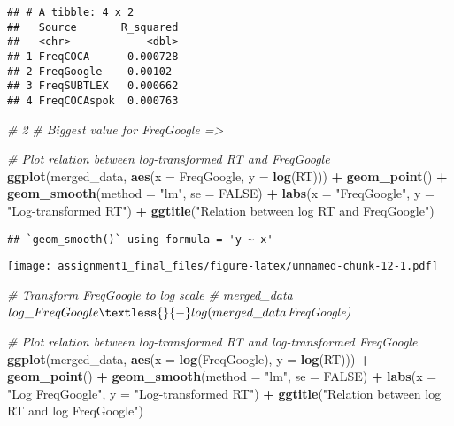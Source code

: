 \documentclass[
]{article}
\newenvironment{Shaded}{\begin{snugshade}}{\end{snugshade}}
\newcommand{\AttributeTok}[1]{\textcolor[rgb]{0.13,0.29,0.53}{#1}}
\newcommand{\CommentTok}[1]{\textcolor[rgb]{0.56,0.35,0.01}{\textit{#1}}}
\newcommand{\ConstantTok}[1]{\textcolor[rgb]{0.56,0.35,0.01}{#1}}
\newcommand{\FunctionTok}[1]{\textcolor[rgb]{0.13,0.29,0.53}{\textbf{#1}}}
\newcommand{\NormalTok}[1]{#1}
\newcommand{\SpecialCharTok}[1]{\textcolor[rgb]{0.81,0.36,0.00}{\textbf{#1}}}
\newcommand{\StringTok}[1]{\textcolor[rgb]{0.31,0.60,0.02}{#1}}
\begin{document}
\begin{verbatim}
## # A tibble: 4 x 2
##   Source       R_squared
##   <chr>            <dbl>
## 1 FreqCOCA      0.000728
## 2 FreqGoogle    0.00102 
## 3 FreqSUBTLEX   0.000662
## 4 FreqCOCAspok  0.000763
\end{verbatim}

\begin{Shaded}
\begin{Highlighting}[]
\CommentTok{\# 2}
\CommentTok{\# Biggest value for FreqGoogle =\textgreater{}}

\CommentTok{\# Plot relation between log{-}transformed RT and FreqGoogle}
\FunctionTok{ggplot}\NormalTok{(merged\_data, }\FunctionTok{aes}\NormalTok{(}\AttributeTok{x =}\NormalTok{ FreqGoogle, }\AttributeTok{y =} \FunctionTok{log}\NormalTok{(RT))) }\SpecialCharTok{+}
  \FunctionTok{geom\_point}\NormalTok{() }\SpecialCharTok{+}
  \FunctionTok{geom\_smooth}\NormalTok{(}\AttributeTok{method =} \StringTok{"lm"}\NormalTok{, }\AttributeTok{se =} \ConstantTok{FALSE}\NormalTok{) }\SpecialCharTok{+}
  \FunctionTok{labs}\NormalTok{(}\AttributeTok{x =} \StringTok{"FreqGoogle"}\NormalTok{, }\AttributeTok{y =} \StringTok{"Log{-}transformed RT"}\NormalTok{) }\SpecialCharTok{+}
  \FunctionTok{ggtitle}\NormalTok{(}\StringTok{"Relation between log RT and FreqGoogle"}\NormalTok{)}
\end{Highlighting}
\end{Shaded}

\begin{verbatim}
## `geom_smooth()` using formula = 'y ~ x'
\end{verbatim}

\texttt{[image: assignment1\_final\_files/figure-latex/unnamed-chunk-12-1.pdf]}

\begin{Shaded}
\begin{Highlighting}[]
\CommentTok{\# Transform FreqGoogle to log scale}
\CommentTok{\# merged\_data$log\_FreqGoogle \textless{}{-} log(merged\_data$FreqGoogle)}

\CommentTok{\# Plot relation between log{-}transformed RT and log{-}transformed FreqGoogle}
\FunctionTok{ggplot}\NormalTok{(merged\_data, }\FunctionTok{aes}\NormalTok{(}\AttributeTok{x =} \FunctionTok{log}\NormalTok{(FreqGoogle), }\AttributeTok{y =} \FunctionTok{log}\NormalTok{(RT))) }\SpecialCharTok{+}
  \FunctionTok{geom\_point}\NormalTok{() }\SpecialCharTok{+}
  \FunctionTok{geom\_smooth}\NormalTok{(}\AttributeTok{method =} \StringTok{"lm"}\NormalTok{, }\AttributeTok{se =} \ConstantTok{FALSE}\NormalTok{) }\SpecialCharTok{+}
  \FunctionTok{labs}\NormalTok{(}\AttributeTok{x =} \StringTok{"Log FreqGoogle"}\NormalTok{, }\AttributeTok{y =} \StringTok{"Log{-}transformed RT"}\NormalTok{) }\SpecialCharTok{+}
  \FunctionTok{ggtitle}\NormalTok{(}\StringTok{"Relation between log RT and log FreqGoogle"}\NormalTok{)}
\end{Highlighting}
\end{Shaded}
\end{document}
